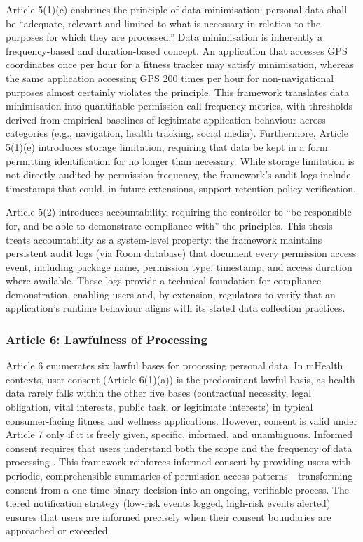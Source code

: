 Article 5(1)(c) enshrines the principle of data minimisation: personal data shall be ``adequate, relevant and limited to what is necessary in relation to the purposes for which they are processed.'' Data minimisation is inherently a frequency-based and duration-based concept. An application that accesses GPS coordinates once per hour for a fitness tracker may satisfy minimisation, whereas the same application accessing GPS 200 times per hour for non-navigational purposes almost certainly violates the principle. This framework translates data minimisation into quantifiable permission call frequency metrics, with thresholds derived from empirical baselines of legitimate application behaviour across categories (e.g., navigation, health tracking, social media). Furthermore, Article 5(1)(e) introduces storage limitation, requiring that data be kept in a form permitting identification for no longer than necessary. While storage limitation is not directly audited by permission frequency, the framework's audit logs include timestamps that could, in future extensions, support retention policy verification.

Article 5(2) introduces accountability, requiring the controller to ``be responsible for, and be able to demonstrate compliance with'' the principles. This thesis treats accountability as a system-level property: the framework maintains persistent audit logs (via Room database) that document every permission access event, including package name, permission type, timestamp, and access duration where available. These logs provide a technical foundation for compliance demonstration, enabling users and, by extension, regulators to verify that an application's runtime behaviour aligns with its stated data collection practices.

\subsubsection{Article 6: Lawfulness of Processing}
Article 6 enumerates six lawful bases for processing personal data. In mHealth contexts, user consent (Article 6(1)(a)) is the predominant lawful basis, as health data rarely falls within the other five bases (contractual necessity, legal obligation, vital interests, public task, or legitimate interests) in typical consumer-facing fitness and wellness applications. However, consent is valid under Article 7 only if it is freely given, specific, informed, and unambiguous. Informed consent requires that users understand both the scope and the frequency of data processing \cite{14}. This framework reinforces informed consent by providing users with periodic, comprehensible summaries of permission access patterns—transforming consent from a one-time binary decision into an ongoing, verifiable process. The tiered notification strategy (low-risk events logged, high-risk events alerted) ensures that users are informed precisely when their consent boundaries are approached or exceeded.

